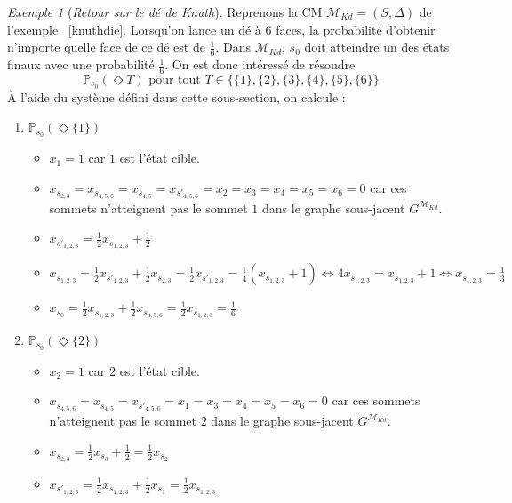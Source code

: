 \documentclass[12pt,a4paper]{report}
\theoremstyle{definition}%
\theoremstyle{remark}
\newtheorem{example}{Exemple}[chapter]
\let\labelitemi\labelitemii
\begin{document}
\begin{example}[\textit{Retour sur le dé de Knuth}]
	Reprenons la CM $\mathcal{M}_{Kd} = (S, \Delta)$ de l'exemple ~\ref{knuthdie}. Lorsqu'on lance un dé à $6$ faces, la probabilité d'obtenir n'importe quelle face de ce dé est de $\frac{1}{6}$. Dans $\mathcal{M}_{Kd}$, $s_0$ doit atteindre un des états finaux avec une probabilité $\frac{1}{6}$. On est donc intéressé de résoudre \[\mathbb{P}_{s_0}(\Diamond T) \text{ pour tout }T \in \{\{1\},\{2\},\{3\},\{4\},\{5\},\{6\}\} \]
	\`A l'aide du système défini dans cette sous-section, on calcule :
	\begin{spacing}{1.5}
	\begin{enumerate}
		\item $\mathbb{P}_{s_0} (\Diamond \{1\})$
		\begin{itemize}
			\renewcommand{\labelitemi}{\tiny$\bullet$}
			\item $x_1 = 1 $ car $1$ est l'état cible.
			\item $x_{s_{2, 3}} = x_{s_{4, 5, 6}} = x_{s_{4, 5}} = x_{s'_{4, 5, 6}} = x_2 = x_3 = x_4 = x_5 = x_6 = 0$ car ces sommets n'atteignent pas le sommet $1$ dans le graphe sous-jacent $G^{\mathcal{M}_{Kd}}$.
			\item $x_{s'_{1, 2, 3}} = \frac{1}{2} x_{s_{1, 2, 3}} + \frac{1}{2}$
			\item $x_{s_{1, 2, 3}} = \frac{1}{2} x_{s'_{1, 2, 3}} + \frac{1}{2}x_{s_{2, 3}} = \frac{1}{2} x_{s'_{1, 2, 3}} = \frac{1}{4} (x_{s_{1, 2, 3}} + 1) \Leftrightarrow
			4 x_{s_{1, 2, 3}} =x_{s_{1, 2, 3}} + 1 \Leftrightarrow x_{s_{1, 2, 3}} = \frac{1}{3}$
			\item $x_{s_0} = \frac{1}{2} x_{s_{1,2,3}} + \frac{1}{2} x_{s_{4, 5, 6}} = \frac{1}{2} x_{s_{1,2,3}} = \frac{1}{6}$
		\end{itemize}
		\item $\mathbb{P}_{s_0} ( \Diamond \{2\})$
		\begin{itemize}
			\renewcommand{\labelitemi}{\tiny$\bullet$}
			\item $x_2 = 1 $ car $2$ est l'état cible.
			\item $x_{s_{4, 5, 6}} = x_{s_{4, 5}} = x_{s'_{4, 5, 6}} = x_1 = x_3 = x_4 = x_5 = x_6 = 0$ car ces sommets n'atteignent pas le sommet $2$ dans le graphe sous-jacent $G^{\mathcal{M}_{Kd}}$.
			\item $x_{s_{2, 3}} = \frac{1}{2} x_{s_3}  + \frac{1}{2} = \frac{1}{2} x_{s_2}$
			\item $x_{s'_{1, 2, 3}} = \frac{1}{2} x_{s_{1, 2, 3}} + \frac{1}{2} x_{s_1} = \frac{1}{2} x_{s_{1, 2, 3}}$

\end{itemize}
\end{enumerate}
\end{spacing}
\end{example}
\end{document}
